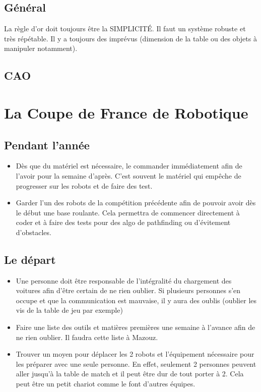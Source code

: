 \documentclass[a4paper, 11pt]{report}
\begin{document}
\chapter{Général}

La règle d'or doit toujours être la SIMPLICITÉ. Il faut un système robuste et très répétable. Il y a toujours des imprévus (dimension de la table ou des objets à manipuler notamment).

\chapter{CAO}

\part{La Coupe de France de Robotique}

\chapter{Pendant l'année}
\begin{itemize}
\item Dès que du matériel est nécessaire, le commander immédiatement afin de l’avoir pour la semaine d’après. C’est souvent le matériel qui empêche de progresser sur les robots et de faire des test.
\item Garder l'un des robots de la compétition précédente afin de pouvoir avoir dès le début une base roulante. Cela permettra de commencer directement à coder et à faire des tests pour des algo de pathfinding ou d'évitement d'obstacles.
\end{itemize}
\chapter{Le départ}
\begin{itemize}
\item Une personne doit être responsable de l'intégralité du chargement des voitures afin d'être certain de ne rien oublier. Si plusieurs personnes s'en occupe et que la communication est mauvaise, il y aura des oublis (oublier les vis de la table de jeu par exemple)
\item Faire une liste des outils et matières premières une semaine à l’avance afin de ne rien oublier. Il faudra cette liste à Mazouz.
\item Trouver un moyen pour déplacer les 2 robots et l’équipement nécessaire pour les préparer avec une seule personne. En effet, seulement 2 personnes peuvent aller jusqu’à la table de match et il peut être dur de tout porter à 2. Cela peut être un petit chariot comme le font d’autres équipes.
\end{itemize}
\end{document}
